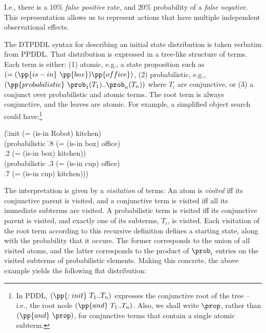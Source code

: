\noindent I.e., there is a 10\% {\em false positive} rate, and 20\%
  probability of a {\em false negative}. This representation allows us to represent actions that have multiple independent observational effects.

The DTPDDL syntax for describing an initial state
distribution is taken verbatim from PPDDL. That distribution is expressed in a tree-like
structure of terms. Each term is either: (1) atomic, e.g., a state
proposition such as $(=(\pp{is-in}~\pp{box})\pp{office})$, (2)
probabilistic, e.g., $(\pp{probabilistic}~\prob_1 (T_1) .. \prob_n
(T_n))$ where $T_i$ are conjunctive, or (3) a conjunct over
probabilistic and atomic terms. The root term is always conjunctive,
and the leaves are atomic. For example, a simplified object search
could have:\footnote{In PDDL, $(\pp{:init}~T_1..T_n)$ expresses the
conjunctive root of the tree -- i.e., the root node
$(\pp{and}~T_1..T_n)$. Also, we shall write $\prop$, rather than
$(\pp{and}~\prop)$, for conjunctive terms that contain a single atomic
subterm.}

\small
\begin{tabtt}
(\=:init (= (is-in Robot) kitchen) \+ \\
       (probabilistic \=.8 (= (is-in box) office)  \\
		      \>.2 (= (is-in box) kitchen)) \\
       (probabilistic .3 (= (is-in cup) office)  \\
		      \>.7 (= (is-in cup) kitchen))) \\
\end{tabtt}
\normalsize

\vspace{-1ex}

\noindent The interpretation is given
by a {\em visitation} of terms: An atom is {\em visited} iff
its conjunctive parent is visited, and a conjunctive term is visited
iff all its immediate subterms are visited. A probabilistic term is
visited iff its conjunctive parent is visited, and exactly one of its
subterms, $T_i$, is visited. Each visitation of the root term
according to this recursive definition defines a starting state,
along with the probability that it occurs. The former corresponds to the
union of all visited atoms, and the latter corresponds to the product
of $\prob_i$ entries on the visited subterms of probabilistic
elements. Making this concrete, the above example yields the
following flat distribution:



